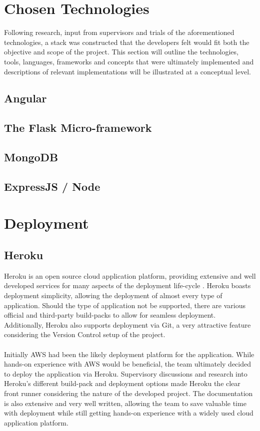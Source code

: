 \section{Chosen Technologies}
Following research, input from supervisors and trials of the aforementioned technologies, a stack was constructed that the developers felt would fit both the objective and scope of the project. This section will outline the technologies, tools, languages, frameworks and concepts that were ultimately implemented and descriptions of relevant implementations will be illustrated at a conceptual level.

\subsection{Angular}
\subsection{The Flask Micro-framework}
\subsection{MongoDB}
\subsection{ExpressJS / Node}

\section{Deployment}
\subsection{Heroku}
Heroku is an open source cloud application platform, providing extensive and well developed services for many aspects of the deployment life-cycle \cite{HEROKU}. Heroku boasts deployment simplicity, allowing the deployment of almost every type of application. Should the type of application not be supported, there are various official and third-party build-packs to allow for seamless deployment. Additionally, Heroku also supports deployment via Git, a very attractive feature considering the Version Control setup of the project.

\paragraph{}
Initially AWS had been the likely deployment platform for the application. While hands-on experience with AWS would be beneficial, the team ultimately decided to deploy the application via Heroku. Supervisory discussions and research into Heroku's different build-pack and deployment options made Heroku the clear front runner considering the nature of the developed project. The documentation is also extensive and very well written, allowing the team to save valuable time with deployment while still getting hands-on experience with a widely used cloud application platform.

